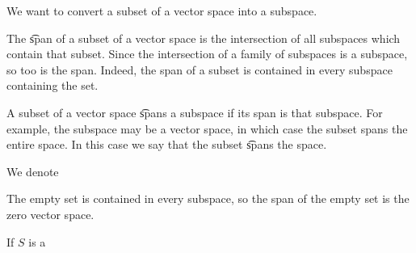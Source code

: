 

We want to convert a subset of a vector space into a subspace.


The \t{span} of a subset of a vector space is the intersection of all subspaces which contain that subset.
Since the intersection of a family of subspaces is a subspace, so too is the span.
Indeed, the span of a subset is contained in every subspace containing the set.

A subset of a vector space \t{spans} a subspace if its span is that subspace.
For example, the subspace may be a vector space, in which case the subset spans the entire space.
In this case we say that the subset \t{spans the space}.


We denote


\begin{prop}
  The empty set is contained in every subspace, so the span of the empty set is the zero vector space.
\end{prop}

If $S$ is a
